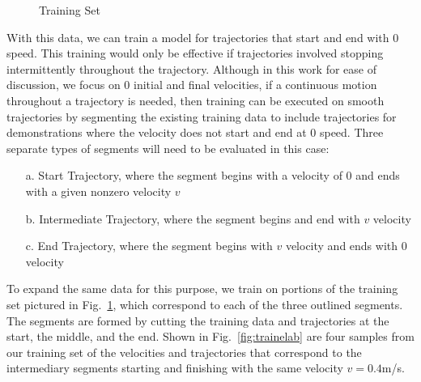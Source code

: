 \documentclass[letterpaper, 10 pt, conference]{ieeeconf}  %
\newcommand\NB[1]{$\spadesuit$\footnote{NB: #1}}
\begin{document}
\begin{figure}[H]
	\centering
	\caption{Training Set}
	\label{fig:train}
		\vspace{-15pt}
\end{figure}
With this data, we can train a model for trajectories that start and end with $0$ speed. This training would only be effective if trajectories involved stopping intermittently throughout the trajectory. Although in this work for ease of discussion, we focus on $0$ initial and final velocities, if a continuous motion throughout a trajectory is needed, then training can be executed on smooth trajectories by segmenting the existing training data to include trajectories for demonstrations where the velocity does not start and end at $0$ speed. Three separate types of segments will need to be evaluated in this case:
\begin{itemize}
    \item[a.] Start Trajectory, where the segment begins with a velocity of $0$ and ends with a given nonzero velocity $v$
    \item[b.] Intermediate Trajectory, where the segment begins and end with $v$ velocity
    \item[c.] End Trajectory, where the segment begins with $v$ velocity and ends with $0$ velocity
\end{itemize}
To expand the same data for this purpose, we train on portions of the training set pictured in Fig.~\ref{fig:train}, which correspond to each of the three outlined segments. The segments are formed by cutting the training data and trajectories at the start, the middle, and the end. Shown in Fig.~\ref{fig:trainelab} are four samples from our training set of the velocities and trajectories that correspond to the intermediary segments starting and finishing with the same velocity $v=0.4$m/s. %
\end{document}
